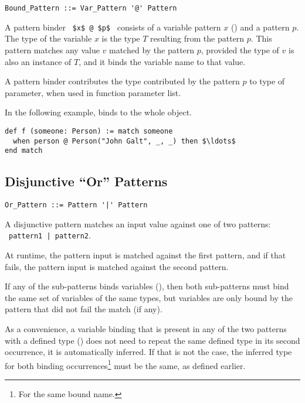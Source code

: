 \syntax\begin{lstlisting}
Bound_Pattern ::= Var_Pattern '@' Pattern
\end{lstlisting}

A pattern binder ~\lstinline!$x$ @ $p$!~ consists of a variable pattern $x$ () and a pattern $p$. The type of the variable $x$ is the type $T$ resulting from the pattern $p$. This pattern matches any value $v$ matched by the pattern $p$, provided the type of $v$ is also an instance of $T$, and it binds the variable name to that value. 

A pattern binder contributes the type contributed by the pattern $p$ to type of parameter, when used in function parameter list. 

\example In the following example,  binds to the whole  object. 
\begin{lstlisting}
def f (someone: Person) := match someone
  when person @ Person("John Galt", _, _) then $\ldots$
end match
\end{lstlisting}





\subsection{Disjunctive ``Or'' Patterns}
\label{sec:disjunctive-patterns}

\syntax\begin{lstlisting}
Or_Pattern ::= Pattern '|' Pattern
\end{lstlisting}

A disjunctive pattern matches an input value against one of two patterns: ~\lstinline!pattern1 | pattern2!. 

At runtime, the pattern input is matched against the first pattern, and if that fails, the pattern input is matched against the second pattern. 

If any of the sub-patterns binds variables (), then both sub-patterns must bind the same set of variables of the same types, but variables are only bound by the pattern that did not fail the match (if any). 

As a convenience, a variable binding that is present in any of the two patterns with a defined type () does not need to repeat the same defined type in its second occurrence, it is automatically inferred. If that is not the case, the inferred type for both binding occurrences\footnote{For the same bound name.} must be the same, as defined earlier. 

